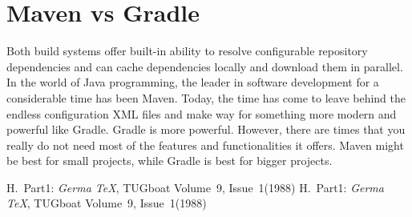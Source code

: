 \documentclass[a4paper,11pt]{article}
\begin{document}
\section{Maven vs Gradle}
Both build systems offer built-in ability to resolve configurable repository dependencies and
can cache dependencies locally and download them in parallel. In the world of Java programming,
the leader in software development for a considerable time has been Maven. Today, the time has
come to leave behind the endless configuration XML files and make way for something more modern
and powerful like Gradle. Gradle is more powerful. However, there are times that you really do
not need most of the features and functionalities it offers. Maven might be best for small
projects, while Gradle is best for bigger projects\cite{DZone}.

\begin{thebibliography}{99}
     H.~Part1: \emph{Germa \TeX}, TUGboat Volume~9, Issue~1(1988) 
     H.~Part1: \emph{Germa \TeX}, TUGboat Volume~9, Issue~1(1988) 
\end{thebibliography}
\end{document}
